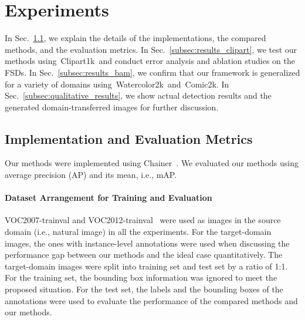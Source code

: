 \documentclass[10pt,twocolumn,letterpaper]{article}
\newcommand{\Sref}[1]{Sec.~\ref{#1}}
\newcommand{\datasetclipart}{Clipart1k}
\newcommand{\datasetwatercolor}{Watercolor2k}
\newcommand{\datasetcomic}{Comic2k}
\begin{document}
\section{Experiments}
\label{sec:experiment}
In \Sref{subsec:impl_metrics}, we explain the details of the implementations, the compared methods, and the evaluation metrics.
In \Sref{subsec:results_clipart}, we test our methods using~\datasetclipart~and conduct error analysis and ablation studies on the FSDs.
In \Sref{subsec:results_bam}, we confirm that our framework is generalized for a variety of domains using~\datasetwatercolor~and~\datasetcomic.
In \Sref{subsec:qualitative_results}, we show actual detection results and the generated domain-transferred images for further discussion.

\subsection{Implementation and Evaluation Metrics}
\label{subsec:impl_metrics}

Our methods were implemented using Chainer~\cite{tokui2015chainer}.
We evaluated our methods using average precision (AP) and its mean, i.e., mAP.

\paragraph{Dataset Arrangement for Training and Evaluation}
VOC2007-trainval and VOC2012-trainval~\cite{everingham2010pascal} were used as images in the source domain (i.e., natural image) in all the experiments.
For the target-domain images, the ones with instance-level annotations were used when discussing the performance gap between our methods and the ideal case quantitatively.
The target-domain images were split into training set and test set by a ratio of 1:1.
For the training set, the bounding box information was ignored to meet the proposed situation.
For the test set, the labels and the bounding boxes of the annotations were used to evaluate the performance of the compared methods and our methods.
\end{document}

